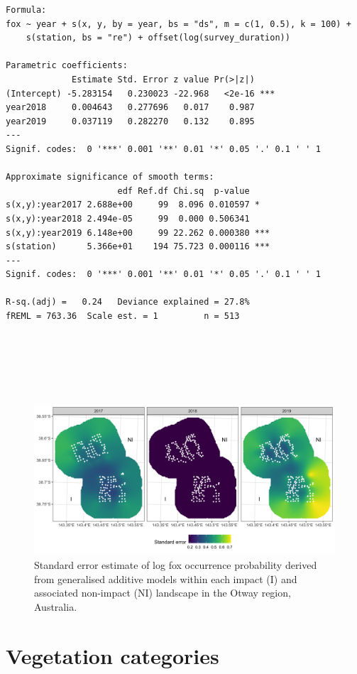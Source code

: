 \documentclass[11pt,a4paper,titlepage,twoside,openright]{style/unimelbthesis}
\begin{document}
\begin{mainmatter}
\begin{verbatim}
Formula:
fox ~ year + s(x, y, by = year, bs = "ds", m = c(1, 0.5), k = 100) + 
    s(station, bs = "re") + offset(log(survey_duration))

Parametric coefficients:
             Estimate Std. Error z value Pr(>|z|)    
(Intercept) -5.283154   0.230023 -22.968   <2e-16 ***
year2018     0.004643   0.277696   0.017    0.987    
year2019     0.037119   0.282270   0.132    0.895    
---
Signif. codes:  0 '***' 0.001 '**' 0.01 '*' 0.05 '.' 0.1 ' ' 1

Approximate significance of smooth terms:
                      edf Ref.df Chi.sq  p-value    
s(x,y):year2017 2.688e+00     99  8.096 0.010597 *  
s(x,y):year2018 2.494e-05     99  0.000 0.506341    
s(x,y):year2019 6.148e+00     99 22.262 0.000380 ***
s(station)      5.366e+01    194 75.723 0.000116 ***
---
Signif. codes:  0 '***' 0.001 '**' 0.01 '*' 0.05 '.' 0.1 ' ' 1

R-sq.(adj) =   0.24   Deviance explained = 27.8%
fREML = 763.36  Scale est. = 1         n = 513
\end{verbatim}
\newpage

\(~\)

\(~\)

\(~\)
\begin{figure}

{\centering \includegraphics[width=1\linewidth]{figure/fox_occ_se_otways_600dpi} 

}

\caption{Standard error estimate of log fox occurrence probability derived from generalised additive models within each impact (I) and associated non-impact (NI) landscape in the Otway region, Australia.}\label{fig:density-fox-se-o}
\end{figure}
\newpage

\hypertarget{density-app-veg}{%
\section{Vegetation categories}\label{density-app-veg}}


\end{mainmatter}
\end{document}
